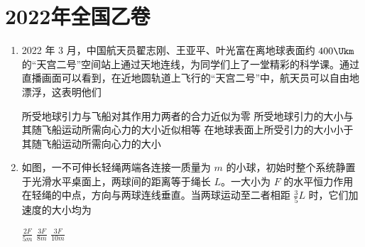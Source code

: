 \documentclass[\gkver]{gaokaozhenti}
\begin{document}
\chapter{2022年全国乙卷}

\begin{enumerate}
\item
2022 年 3 月，中国航天员翟志刚、王亚平、叶光富在离地球表面约 $400\Ukm$ 的“天宫二号”空间站上通过天地连线，为同学们上了一堂精彩的科学课。通过直播画面可以看到，在近地圆轨道上飞行的“天宫二号”中，航天员可以自由地漂浮，这表明他们

{所受地球引力与飞船对其作用力两者的合力近似为零}
{所受地球引力的大小与其随飞船运动所需向心力的大小近似相等}
{在地球表面上所受引力的大小小于其随飞船运动所需向心力的大小}


\item
如图，一不可伸长轻绳两端各连接一质量为 $m$ 的小球，初始时整个系统静置于光滑水平桌面上，两球间的距离等于绳长 $L$。一大小为 $F$ 的水平恒力作用在轻绳的中点，方向与两球连线垂直。当两球运动至二者相距 $\frac{3}{5}L$ 时，它们加速度的大小均为


{$\frac{2F}{5m}$}
{$\frac{3F}{8m}$}
{$\frac{3F}{10m}$}

\end{enumerate}
\end{document}
